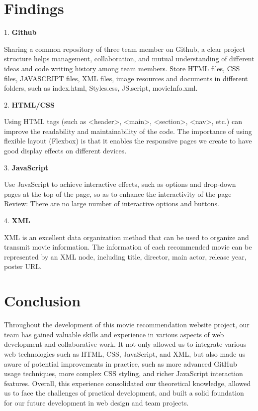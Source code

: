 \documentclass{article}
\begin{document}
\section{Findings}

1. \textbf{Github}

Sharing a common repository of three team member on Github, a clear project structure helps management, collaboration, and mutual understanding of different ideas and code writing history among team members. Store HTML files, CSS files, JAVASCRIPT files, XML files, image resources and documents in different folders, such as index.html, Styles.css, JS.script, movieInfo.xml.

2. \textbf{HTML/CSS}

Using HTML tags (such as <header>, <main>, <section>, <nav>, etc.) can improve the readability and maintainability of the code.
The importance of using flexible layout (Flexbox) is that it enables the responsive pages we create to have good display effects on different devices.

3. \textbf{JavaScript}

Use JavaScript to achieve interactive effects, such as options and drop-down pages at the top of the page, so as to enhance the interactivity of the page
Review: There are no large number of interactive options and buttons.

4. \textbf{XML}

XML is an excellent data organization method that can be used to organize and transmit movie information. The information of each recommended movie can be represented by an XML node, including title, director, main actor, release year, poster URL.

\section{Conclusion}

Throughout the development of this movie recommendation website project, our team has gained valuable skills and experience in various aspects of web development and collaborative work. It not only allowed us to integrate various web technologies such as HTML, CSS, JavaScript, and XML, but also made us aware of potential improvements in practice, such as more advanced GitHub usage techniques, more complex CSS styling, and richer JavaScript interaction features. Overall, this experience consolidated our theoretical knowledge, allowed us to face the challenges of practical development, and built a solid foundation for our future development in web design and team projects.
\end{document}
